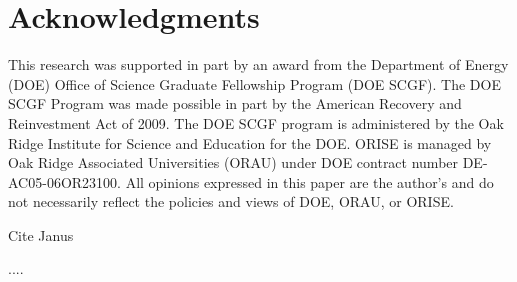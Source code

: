 \documentclass{PoS}
\begin{document}
\section{Acknowledgments}
This research was supported in part by an award from the Department of Energy (DOE) Office of Science Graduate Fellowship Program (DOE SCGF). The DOE SCGF Program was made possible in part by the American Recovery and Reinvestment Act of 2009.  The DOE SCGF program is administered by the Oak Ridge Institute for Science and Education for the DOE. ORISE is managed by Oak Ridge Associated Universities (ORAU) under DOE contract number DE-AC05-06OR23100.  All opinions expressed in this paper are the author's and do not necessarily reflect the policies and views of DOE, ORAU, or ORISE.

Cite Janus

\begin{thebibliography}{99}
   ....
\end{thebibliography}
\end{document}
